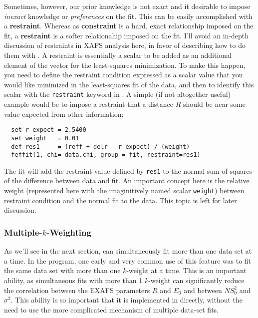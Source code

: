 Sometimes, however, our prior knowledge is not exact and it desirable to
impose {\emph{inexact}} knowledge or {\emph{preferences}} on the fit.  This
can be easily accomplished with a {\bf{restraint}}.  Whereas as
{\bf{constraint}} is a hard, exact relationship imposed on the fit, a
{\bf{restraint}} is a softer relationahip imposed on the fit.  I'll avoid
an in-depth discussion of restraints in XAFS analysis here, in favor of
describing how to do them with {\ifeffit}.  A restraint is essentially a
scalar to be added as an additional element of the vector for the
least-squares minimization.  To make this happen, you need to define the
restraint condition expressed as a scalar value that you would like
minimized in the least-squares fit of the data, and then to identify this
scalar with the {\tt{restraint}} keyword in {}.  A simple (if
not altogether useful) example would be to impose a restraint that a
distance $R$ should be near some value expected from other information:
\begin{verbatim}
  set r_expect = 2.5400
  set weight   = 0.01
  def res1     = (reff + delr - r_expect) / (weight)
  feffit(1, chi= data.chi, group = fit, restraint=res1)
\end{verbatim}
\noindent
The fit will add the restraint value defined by {\tt{res1}} to the normal
sum-of-squares of the difference between data and fit.  An important
concept here is the relative weight (represented here with the
imaginitively named scalar {\tt{weight}}) between restraint condition and
the normal fit to the data.  This topic is left for later discussion.


\subsubsection{Multiple-$k$-Weighting} \label{Ch:FEFFIT-multi-k-fit}
{}

As we'll see in the next section, {\ifeffit} can simultaneously fit more
than one data set at a time.  In the {\feffit} program, one early and very
common use of this feature was to fit the same data set with more than one
$k$-weight at a time.  This is an important ability, as simultaneous fits
with more than 1 $k$-weight can significantly reduce the correlation
between the EXAFS parameters $R$ and $E_0$ and between $NS_0^2$ and
$\sigma^2$.  This ability is so important that it is implemented in
{\ifeffit} directly, without the need to use the more complicated mechanism
of multiple data-set fits.

